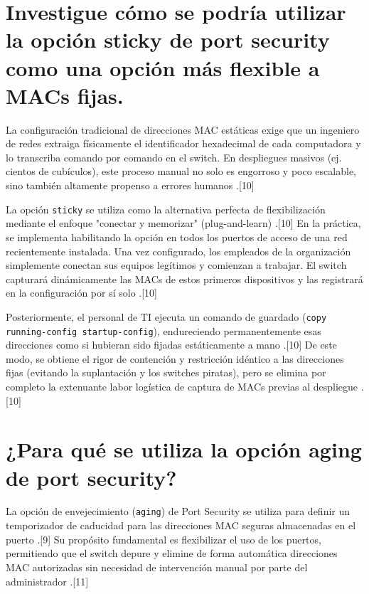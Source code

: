 \documentclass[a4paper,12pt]{article}
\begin{document}
\newpage

\section{Investigue cómo se podría utilizar la opción sticky de port security como una opción más flexible a MACs fijas.}

La configuración tradicional de direcciones MAC estáticas exige que un ingeniero de redes extraiga físicamente el identificador hexadecimal de cada computadora y lo transcriba comando por comando en el switch. En despliegues masivos (ej. cientos de cubículos), este proceso manual no solo es engorroso y poco escalable, sino también altamente propenso a errores humanos \cite{reddit_sticky}.[10]

La opción \texttt{sticky} se utiliza como la alternativa perfecta de flexibilización mediante el enfoque "conectar y memorizar" (plug-and-learn) \cite{reddit_sticky}.[10] En la práctica, se implementa habilitando la opción en todos los puertos de acceso de una red recientemente instalada. Una vez configurado, los empleados de la organización simplemente conectan sus equipos legítimos y comienzan a trabajar. El switch capturará dinámicamente las MACs de estos primeros dispositivos y las registrará en la configuración por sí solo \cite{reddit_sticky}.[10]

Posteriormente, el personal de TI ejecuta un comando de guardado (\texttt{copy running-config startup-config}), endureciendo permanentemente esas direcciones como si hubieran sido fijadas estáticamente a mano \cite{reddit_sticky}.[10] De este modo, se obtiene el rigor de contención y restricción idéntico a las direcciones fijas (evitando la suplantación y los switches piratas), pero se elimina por completo la extenuante labor logística de captura de MACs previas al despliegue \cite{reddit_sticky}.[10]

\newpage

\section{¿Para qué se utiliza la opción aging de port security?}

La opción de envejecimiento (\texttt{aging}) de Port Security se utiliza para definir un temporizador de caducidad para las direcciones MAC seguras almacenadas en el puerto \cite{cisco_9200}.[9] Su propósito fundamental es flexibilizar el uso de los puertos, permitiendo que el switch depure y elimine de forma automática direcciones MAC autorizadas sin necesidad de intervención manual por parte del administrador \cite{networklessons_aging}.[11]
\end{document}
